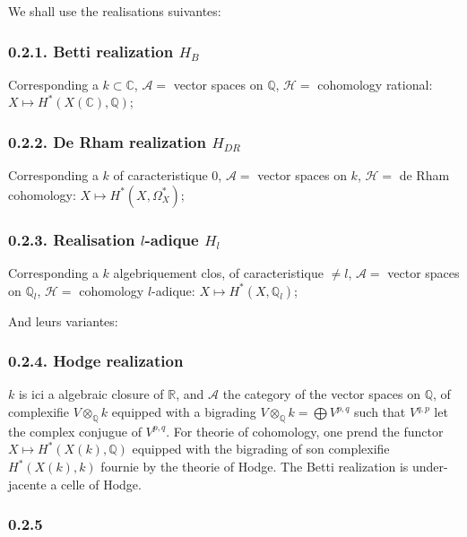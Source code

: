 \documentclass[12pt,a4paper]{article}
\theoremstyle{plain}
\theoremstyle{definition}
\theoremstyle{remark}
\newcommand{\Q}{\mathbb{Q}}
\newcommand{\R}{\mathbb{R}}
\newcommand{\C}{\mathbb{C}}
\begin{document}
We shall use the realisations suivantes:

\subsubsection*{0.2.1. Betti realization $H_B$}

Corresponding a $k \subset \C$, $\mathcal{A} =$ vector spaces on $\Q$,
$\mathcal{H} =$ cohomology rational: $X \mapsto H^*(X(\C), \Q)$;

\subsubsection*{0.2.2. De Rham realization $H_{DR}$}

Corresponding a $k$ of caracteristique $0$, $\mathcal{A} =$ vector spaces on $k$,
$\mathcal{H} =$ de Rham cohomology: $X \mapsto H^*(X, \Omega^*_X)$;

\subsubsection*{0.2.3. Realisation $l$-adique $H_l$}

Corresponding a $k$ algebriquement clos, of caracteristique $\neq l$,
$\mathcal{A} =$ vector spaces on $\Q_l$, $\mathcal{H} =$ cohomology $l$-adique:
$X \mapsto H^*(X, \Q_l)$;

And leurs variantes:

\subsubsection*{0.2.4. Hodge realization}

$k$ is ici a algebraic closure of $\R$, and $\mathcal{A}$ the category of the vector spaces
on $\Q$, of complexifie $V \otimes_{\Q} k$ equipped with a bigrading
$V \otimes_{\Q} k = \bigoplus V^{p,q}$ such that $V^{q,p}$ let the complex conjugue of $V^{p,q}$.
For theorie of cohomology, one prend the functor $X \mapsto H^*(X(k), \Q)$ equipped with the
bigrading of son complexifie $H^*(X(k), k)$ fournie by the theorie of Hodge. The
Betti realization is under-jacente a celle of Hodge.

\subsubsection*{0.2.5}
\end{document}
